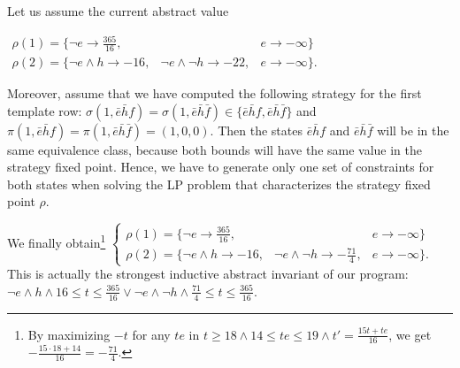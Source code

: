 \documentclass{llncs}
\newcommand{\verr}{\mathit{e}} \newcommand{\vheat}{\mathit{h}} \newcommand{\vfan}{\mathit{f}}
\begin{document}
\begin{example*}
Let us assume the current abstract value \\[0.6ex]
\centerline{$
\begin{array}{lll}
\rho(1)=\{\neg\verr \rightarrow \frac{365}{16}, &&\verr\rightarrow -\infty\}\\
\rho(2)=\{\neg\verr\wedge\vheat \rightarrow -16, &\neg\verr\wedge \neg\vheat \rightarrow -22, &\verr\rightarrow -\infty\}.
\end{array}
$}
Moreover, assume that we have computed the following strategy for the
first template row:
$\sigma(1,\bar{\verr}\bar{\vheat}\vfan)=\sigma(1,\bar{\verr}\bar{\vheat}\bar{\vfan})\in\{\bar{\verr}\bar{\vheat}\vfan,\bar{\verr}\bar{\vheat}\bar{\vfan}\}$ and
$\pi(1,\bar{\verr}\bar{\vheat}\vfan)=\pi(1,\bar{\verr}\bar{\vheat}\bar{\vfan})=(1,0,0)$. 
Then the states $\bar{\verr}\bar{\vheat}\vfan$ and $\bar{\verr}\bar{\vheat}\bar{\vfan}$ will
be in the same equivalence class, because both bounds will have the same
value in the strategy fixed point. Hence, we have to generate only one
set of constraints for both states when solving the LP problem that
characterizes the strategy fixed point $\rho$. 

\noindent We finally obtain\footnote{By maximizing $-t$ for any $te$
  in $t\geq 18 \wedge 14\leq te\leq 19 \wedge t' = \frac{15t+te}{16}$, 
we get $-\frac{15\cdot 18+14}{16}=-\frac{71}{4}$.} 
$
\left\{\begin{array}{lll}
\rho(1)=\{\neg\verr \rightarrow \frac{365}{16}, &&\verr\rightarrow -\infty\}\\
\rho(2)=\{\neg\verr\wedge\vheat \rightarrow -16, &\neg\verr\wedge \neg\vheat \rightarrow -\frac{71}{4}, &\verr\rightarrow -\infty\}.
\end{array}\right.
$
This is actually the strongest inductive abstract
invariant of our program: $\neg\verr\wedge\vheat \wedge 16\leq t\leq
\frac{365}{16} \vee \neg\verr\wedge\neg \vheat \wedge \frac{71}{4}\leq t\leq
\frac{365}{16}$.
\end{example*}
\end{document}

